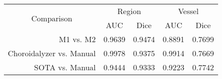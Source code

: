 \begin{tabular}{@{}rllll@{}}
\toprule
  \multicolumn{1}{c}{\multirow{2}{*}{Comparison}} &
  \multicolumn{2}{c}{Region} &
  \multicolumn{2}{c}{Vessel} \\
  \cmidrule(l){2-3}\cmidrule(l){4-5} 
  \multicolumn{1}{c}{} &
  \multicolumn{1}{c}{\acrshort{AUC}} &
  \multicolumn{1}{c}{Dice} &
  \multicolumn{1}{c}{\acrshort{AUC}} &
  \multicolumn{1}{c}{Dice} \\
  \midrule
M1 vs. M2 & 0.9639 & 0.9474 & 0.8891 & 0.7699 \\
Choroidalyzer vs. Manual & 0.9978 & 0.9375 & 0.9914 & 0.7669 \\
\acrshort{SOTA} vs. Manual & 0.9444 & 0.9333 & 0.9223 & 0.7742 \\ 
\bottomrule
\end{tabular}
